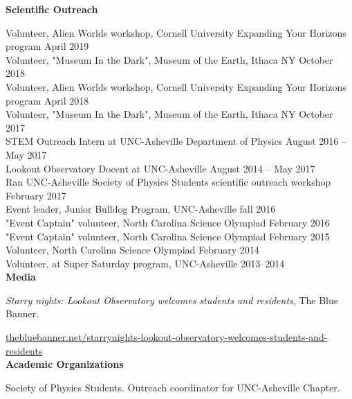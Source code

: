 \documentclass[letterpaper, 11pt]{article}
\newcommand{\noi}{\noindent}
\begin{document}
\noi \textbf{Scientific Outreach}

\noi Volunteer, Alien Worlds workshop, Cornell University Expanding Your Horizons program \hfill April 2019
\\

\noi Volunteer, "Museum In the Dark", Museum of the Earth, Ithaca NY \hfill October 2018
\\

\noi Volunteer, Alien Worlds workshop, Cornell University Expanding Your Horizons program \hfill April 2018
\\

\noi Volunteer, "Museum In the Dark", Museum of the Earth, Ithaca NY \hfill October 2017
\\

\noi STEM Outreach Intern at UNC-Asheville Department of Physics \hfill August 2016 -- May 2017
\\

\noi Lookout Observatory Docent at UNC-Asheville \hfill August 2014 -- May 2017
\\

\noi Ran UNC-Asheville Society of Physics Students scientific outreach workshop \hfill February 2017
\\

\noi Event leader, Junior Bulldog Program, UNC-Asheville \hfill fall 2016 
\\

\noi "Event Captain" volunteer, North Carolina Science Olympiad \hfill February 2016
\\

\noi "Event Captain" volunteer, North Carolina Science Olympiad \hfill February 2015
\\

\noi Volunteer, North Carolina Science Olympiad \hfill February 2014
\\

\noi Volunteer, at Super Saturday program, UNC-Asheville \hfill 2013--2014
\\

\noi \textbf{Media}

\noi \emph{Starry nights: Lookout Observatory welcomes students and residents}, The Blue Banner.

\noi \url{thebluebanner.net/starrynights-lookout-observatory-welcomes-students-and-residents}
\\

\noi \textbf{Academic Organizations}

\noi Society of Physics Students. Outreach coordinator for UNC-Asheville Chapter.
\\
\end{document}
